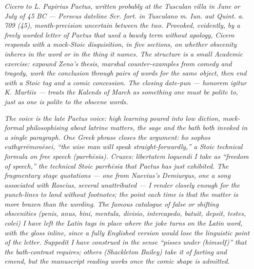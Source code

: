 
\textit{Cicero to L. Papirius Paetus, written probably at the
Tusculan villa in June or July of 45 BC --- Perseus dateline
\textit{Scr. fort. in Tusculano m. Iun. aut Quint. a. 709 (45)},
month-precision uncertain between the two. Provoked, evidently,
by a freely worded letter of Paetus that used a bawdy term
without apology, Cicero responds with a mock-Stoic disquisition,
in five sections, on whether obscenity inheres in the word or in
the thing it names. The structure is a small Academic exercise:
expound Zeno's thesis, marshal counter-examples from comedy and
tragedy, work the conclusion through pairs of words for the same
object, then end with a Stoic tag and a comic concession. The
closing date-pun --- \textit{honorem igitur K. Martiis} ---
treats the Kalends of March as something one must be polite to,
just as one is polite to the obscene words.}

\textit{The voice is the late Paetus voice: high learning poured
into low diction, mock-formal philosophising about latrine
matters, the sage and the bath both invoked in a single
paragraph. One Greek phrase closes the argument: \textit{ho
sophos euthyrr\=emon\=esei}, ``the wise man will speak
straight-forwardly,'' a Stoic technical formula on free speech
(\textit{parrh\=esia}). Cruxes: \textit{libertatem loquendi} I
take as ``freedom of speech,'' the technical Stoic
\textit{parrh\=esia} that Paetus has just exhibited. The
fragmentary stage quotations --- one from Naevius's
\textit{Demiurgus}, one a song associated with Roscius, several
unattributed --- I render closely enough for the punch-lines to
land without footnotes; the point each time is that the matter
is more brazen than the wording. The famous catalogue of false
or shifting obscenities (\textit{penis}, \textit{anus},
\textit{bini}, \textit{mentula}, \textit{divisio},
\textit{intercapedo}, \textit{batuit}, \textit{depsit},
\textit{testes}, \textit{colei}) I have left the Latin tags in
place where the joke turns on the Latin word, with the gloss
inline, since a fully Englished version would lose the linguistic
point of the letter. \textit{Suppedit} I have construed in the
sense ``pisses under (himself)'' that the bath-contrast requires;
others (Shackleton Bailey) take it of farting and emend, but the
manuscript reading works once the comic shape is admitted.}
